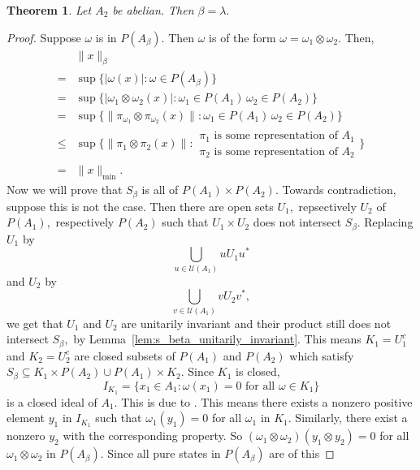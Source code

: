 \documentclass{article}
\theoremstyle{plain}
\newtheorem{theorem}{Theorem}[section]
\theoremstyle{definition}
\theoremstyle{remark}
\begin{document}
\begin{theorem}
    Let $A_2$ be abelian. Then $\beta = \lambda.$
\end{theorem}
\begin{proof}
	Suppose $\omega$ is in $P(A_{\beta}).$ Then $\omega$
	is of the form $\omega = \omega_1 \otimes \omega_2.$
	Then, 
\begin{align*}
	{}& \lVert x \rVert_{\beta} \\
	={}& \sup \{ \lvert \omega(x) \rvert \colon \omega \in P(A_{\beta}) \} \\
	={}& \sup \{ \lvert \omega_1 \otimes \omega_2 (x) \rvert 
	\colon \omega_1 \in  P(A_1)\, \omega_2 \in P(A_2) \} \\
	={}& \sup \{ \lVert \pi_{\omega_1} \otimes \pi_{\omega_2} (x) \rVert
		\colon \omega_1 \in P(A_1)\, \omega_2 \in P(A_2) \} \\
	\leq{}& \sup\{ \lVert \pi_1 \otimes \pi_2 (x) \rVert \colon 
	\begin{array}{c}
		\pi_1 \text{ is some representation of } A_1 \\ 
		\pi_2 \text{ is some representation of } A_2
	\end{array} \} \\
	={}& \lVert x \rVert_{\min} .
\end{align*}
	Now we will prove that $S_{\beta}$ is all of $P(A_1) \times P(A_2).$
	Towards contradiction, suppose this is not the case. Then there are
	open sets $U_1,$ repsectively $U_2$ of $P(A_1),$ respectively $P(A_2)$
such that $U_1 \times U_2$ does not intersect $S_{\beta}.$ Replacing
$U_1$ by
\[
	\bigcup_{u \in \mathcal{U}(A_1)} u U_1 u^\ast
\]
and
$U_2$ by
\[
	\bigcup_{v \in \mathcal{U}(A_1)}  vU_2 v^\ast,
\]
we get that $U_1$ and $U_2$ are unitarily invariant and their product still
does not intersect $S_{\beta},$ by Lemma~\ref{lem:s_beta_unitarily_invariant}. This means
$K_1 = U_1^c$ and $K_2 = U_2^c$ are closed subsets of $P(A_1)$ and $P(A_2)$
which satisfy $S_{\beta} \subseteq K_1 \times  P(A_2) \cup P(A_1) \times K_2.$
Since $K_1$ is closed,
\[
	I_{K_1} = \{ x_1 \in A_1 \colon \omega (x_1) = 0 \text{ for all }
	\omega \in K_1 \}
\]
is a closed ideal of $A_1.$ This is due to \cite[Theorem 4.15]{takesaki79}. This means there exists a nonzero positive element
$y_1$ in $I_{K_1}$ such that $\omega_1(y_1) = 0$ for all $\omega_1$ in $K_1.$
Similarly, there exist a nonzero $y_2$ with the corresponding property.
So $(\omega_1 \otimes \omega_2)(y_1 \otimes y_2) = 0$ for all $\omega_1 \otimes
\omega_2$ in $P(A_{\beta}).$ Since all pure states in $P(A_{\beta})$ are of this 

\end{proof}
\end{document}
